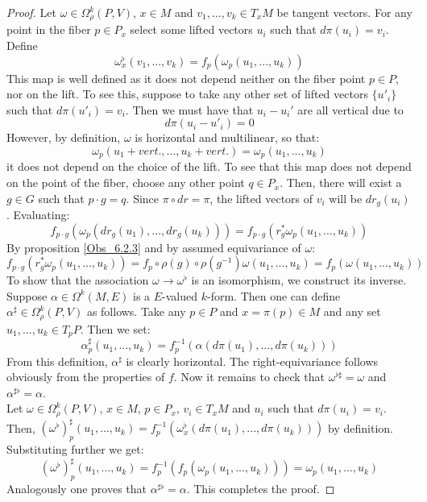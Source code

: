 \documentclass[12pt,a4paper]{report}
\theoremstyle{definition}
\theoremstyle{Theorem}
\theoremstyle{definition}
\theoremstyle{definition}
\begin{document}
	\begin{proof}
		Let $\omega\in\Omega^k_\rho(P,V)$, $x\in M$ and $v_1,...,v_k\in T_xM$ be tangent vectors. For any point in the fiber $p\in P_x$ select some lifted vectors $u_i$ such that $d\pi(u_i)=v_i$. Define $$\omega^\flat_x(v_1,...,v_k)=f_p(\omega_p(u_1,...,u_k))$$
		This map is well defined as it does not depend neither on the fiber point $p\in P$, nor on the lift. To see this, suppose to take any other set of lifted vectors $\{u'_i\}$ such that $d\pi(u'_i)=v_i$. Then we must have that $u_i-u_i'$ are  all vertical due to
		$$d\pi(u_i-u'_i)=0$$
		However, by definition, $\omega$ is horizontal and multilinear, so that:
		$$\omega_p(u_1+vert.,...,u_k+vert.)=\omega_p(u_1,...,u_k)$$
		it does not depend on the choice of the lift. To see that this map does not depend on the point of the fiber, choose any other point $q\in P_x$. Then, there will exist a $g\in G$ such that $p\cdot g=q$. Since $\pi\circ dr=\pi$, the lifted vectors of $v_i$ will be $dr_g(u_i)$. Evaluating:
		$$f_{p\cdot g}(\omega_p(dr_g(u_1),...,dr_g(u_k)))=
		f_{p\cdot g}(r^*_g\omega_p(u_1,...,u_k))$$
		By proposition \ref{Obs_6.2.3} and by assumed equivariance of $\omega$:
		$$f_{p\cdot g}(r^*_g\omega_p(u_1,...,u_k))=f_p\circ \rho(g)\circ \rho(g^{-1})\omega(u_1,...,u_k)=f_p(\omega(u_1,...,u_k))$$
		To show that the association $\omega\rightarrow\omega^\flat$ is an isomorphism, we construct its inverse. Suppose $\alpha\in\Omega^k(M,E)$ is a $E$-valued $k$-form. Then one can define $\alpha^\sharp\in \Omega^k_\rho(P,V)$ as follows. Take any $p\in P$ and $x=\pi(p)\in M$ and any set $u_1,...,u_k\in T_pP$. Then we set:
		$$\alpha^\sharp_p(u_1,...,u_k)=f^{-1}_p(\alpha(d\pi(u_1),...,d\pi(u_k)))$$
		From this definition, $\alpha^\sharp$ is clearly horizontal. The right-equivariance follows obviously from the properties of $f$. Now it remains to check that $\omega^{\flat\sharp}=\omega$ and $\alpha^{\sharp\flat}=\alpha$.\\
		Let $\omega\in\Omega_\rho^k(P,V)$, $x\in M$, $p\in P_x$, $v_i\in T_xM$ and $u_i$ such that $d\pi(u_i)=v_i$.
		Then, $(\omega^\flat)^\sharp_p(u_1,...,u_k)=f^{-1}_p(\omega^\flat_x(d\pi(u_1),...,d\pi(u_k)))$ by definition. Substituting further we get:
		$$(\omega^\flat)^\sharp_p(u_1,...,u_k)=
		f^{-1}_p(f_p(\omega_p(u_1,...,u_k)))=\omega_p(u_1,...,u_k)$$
		Analogously one proves that $\alpha^{\sharp\flat}=\alpha$. This completes the proof.
	\end{proof}
\end{document}
